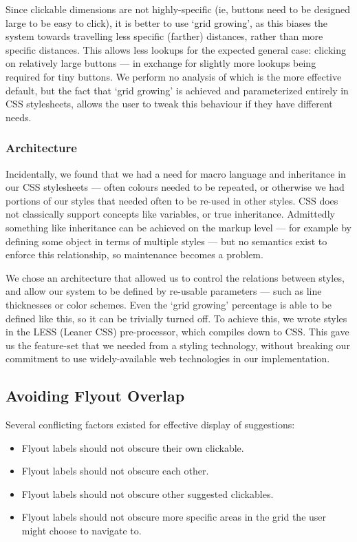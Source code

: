 \documentclass[a4paper, 12pt]{report}
\begin{document}
Since clickable dimensions are not highly-specific (ie, buttons need to be designed large to be easy to click), it is better to use `grid growing', as this biases the system towards travelling less specific (farther) distances, rather than more specific distances. This allows less lookups for the expected general case: clicking on relatively large buttons --- in exchange for slightly more lookups being required for tiny buttons. We perform no analysis of which is the more effective default, but the fact that `grid growing' is achieved and parameterized entirely in CSS stylesheets, allows the user to tweak this behaviour if they have different needs.

\subsubsection{Architecture}
Incidentally, we found that we had a need for macro language and inheritance in our CSS stylesheets --- often colours needed to be repeated, or otherwise we had portions of our styles that needed often to be re-used in other styles. CSS does not classically support concepts like variables, or true inheritance. Admittedly something like inheritance can be achieved on the markup level --- for example by defining some object in terms of multiple styles --- but no semantics exist to enforce this relationship, so maintenance becomes a problem.

We chose an architecture that allowed us to control the relations between styles, and allow our system to be defined by re-usable parameters --- such as line thicknesses or color schemes. Even the `grid growing' percentage is able to be defined like this, so it can be trivially turned off. To achieve this, we wrote styles in the LESS (Leaner CSS)\cite{lesscss} pre-processor, which compiles down to CSS. This gave us the feature-set that we needed from a styling technology, without breaking our commitment to use widely-available web technologies in our implementation.

\subsection{Avoiding Flyout Overlap}
\label{sec:avoidance}
Several conflicting factors existed for effective display of suggestions:

\begin{itemize}
\item Flyout labels should not obscure their own clickable.
\item Flyout labels should not obscure each other.
\item Flyout labels should not obscure other suggested clickables.
\item Flyout labels should not obscure more specific areas in the grid the user might choose to navigate to.
\end{itemize}
\end{document}
